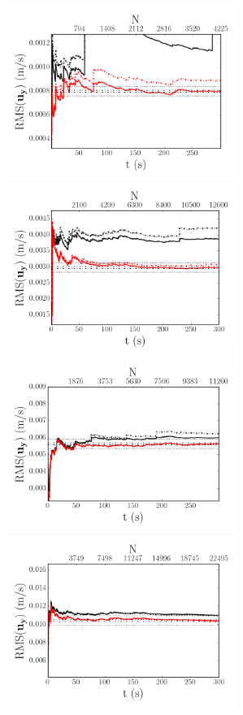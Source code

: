 \documentclass[12pt,oneside,a4paper]{article}
\begin{document}
\begin{figure}
\centering
\includegraphics[width=7.5cm]{images/LDA_timeDependenceImages/4hz_x_400_z_1_RMSuy.png}\hfill
\includegraphics[width=7.5cm]{images/LDA_timeDependenceImages/8hz_x_400_z_1_RMSuy.png}\\
\includegraphics[width=7.5cm]{images/LDA_timeDependenceImages/4hz_x_400_z_15_RMSuy.png}\hfill
\includegraphics[width=7.5cm]{images/LDA_timeDependenceImages/8hz_x_400_z_15_RMSuy.png}\\

\end{figure}
\end{document}
